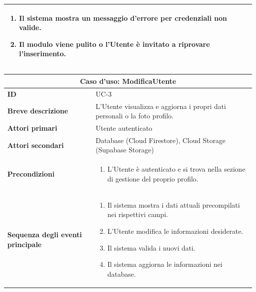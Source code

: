 \documentclass[a4paper]{report}
\begin{document}
\begin{table}[H]
\begin{tabular}{|p{3.9cm}|p{9.9cm}|}
\begin{enumerate}[leftmargin=14pt,label=\arabic*.,labelsep=0.5em,topsep=0pt,partopsep=0pt,parsep=0pt,itemsep=0pt]
   \begin{enumerate}[label=\arabic{enumi}.\arabic*.,leftmargin=22pt,labelsep=0.5em,topsep=0pt,partopsep=0pt,parsep=0pt,itemsep=0pt]
       \item Il sistema mostra un messaggio d'errore per credenziali non valide.
       \item Il modulo viene pulito o l'Utente è invitato a riprovare l'inserimento.
   \end{enumerate}
\end{enumerate}\\ \hline
\end{tabular}
\end{table}

\begin{table}[H]
\vspace*{-0cm}
\renewcommand{\arraystretch}{1.9}
\begin{tabular}{|p{3.9cm}|p{9.9cm}|}
\hline
\multicolumn{2}{|c|}{\textbf{Caso d’uso: ModificaUtente}} \\ \hline
\textbf{ID} & UC-3 \\ \hline
\textbf{Breve descrizione} & L'Utente visualizza e aggiorna i propri dati personali o la foto profilo. \\ \hline
\textbf{Attori primari} & Utente autenticato \\ \hline
\textbf{Attori secondari} & Database (Cloud Firestore), Cloud Storage (Supabase Storage) \\ \hline
\textbf{Precondizioni} & \begin{enumerate}[leftmargin=14pt,label=\arabic*.,labelsep=0.5em,topsep=0pt,partopsep=0pt,parsep=0pt,itemsep=0pt]
    \item L'Utente è autenticato e si trova nella sezione di gestione del proprio profilo.
\end{enumerate} \\ \hline
\textbf{Sequenza degli eventi principale} &
\begin{enumerate}[leftmargin=14pt,label=\arabic*.,labelsep=0.5em,topsep=0pt,partopsep=0pt,parsep=0pt,itemsep=0pt]
   \item Il sistema mostra i dati attuali precompilati nei rispettivi campi.
   \item L'Utente modifica le informazioni desiderate.
   \item Il sistema valida i nuovi dati.
   \item Il sistema aggiorna le informazioni nei database.
\end{enumerate}\\ \hline

\end{tabular}
\end{table}
\end{document}
